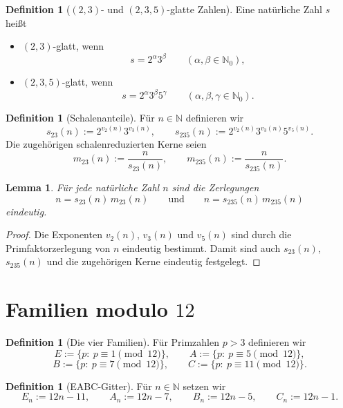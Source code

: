 \documentclass[11pt,a4paper]{article}
\newtheorem{lemma}[satz]{Lemma}
\theoremstyle{definition}
\newtheorem{definition}[satz]{Definition}
\theoremstyle{remark}
\begin{document}
	\begin{definition}[\((2,3)\)- und \((2,3,5)\)-glatte Zahlen]
		Eine natürliche Zahl \(s\) heißt
		\begin{itemize}
			\item \((2,3)\)-glatt, wenn
			\[
			s=2^\alpha 3^\beta
			\qquad (\alpha,\beta\in\mathbb{N}_0),
			\]
			\item \((2,3,5)\)-glatt, wenn
			\[
			s=2^\alpha 3^\beta 5^\gamma
			\qquad (\alpha,\beta,\gamma\in\mathbb{N}_0).
			\]
		\end{itemize}
	\end{definition}
	
	\begin{definition}[Schalenanteile]
		Für \(n\in\mathbb{N}\) definieren wir
		\[
		s_{23}(n):=2^{v_2(n)}3^{v_3(n)},
		\qquad
		s_{235}(n):=2^{v_2(n)}3^{v_3(n)}5^{v_5(n)}.
		\]
		Die zugehörigen schalenreduzierten Kerne seien
		\[
		m_{23}(n):=\frac{n}{s_{23}(n)},
		\qquad
		m_{235}(n):=\frac{n}{s_{235}(n)}.
		\]
	\end{definition}
	
	\begin{lemma}
		Für jede natürliche Zahl \(n\) sind die Zerlegungen
		\[
		n=s_{23}(n)\,m_{23}(n)
		\qquad\text{und}\qquad
		n=s_{235}(n)\,m_{235}(n)
		\]
		eindeutig.
	\end{lemma}
	
	\begin{proof}
		Die Exponenten \(v_2(n)\), \(v_3(n)\) und \(v_5(n)\) sind durch die Primfaktorzerlegung von
		\(n\) eindeutig bestimmt. Damit sind auch \(s_{23}(n)\), \(s_{235}(n)\) und die zugehörigen Kerne
		eindeutig festgelegt.
	\end{proof}
	
	\section{Familien modulo \(12\)}
	
	\begin{definition}[Die vier Familien]
		Für Primzahlen \(p>3\) definieren wir
		\[
		E:=\{p:\ p\equiv 1 \pmod{12}\},\qquad
		A:=\{p:\ p\equiv 5 \pmod{12}\},
		\]
		\[
		B:=\{p:\ p\equiv 7 \pmod{12}\},\qquad
		C:=\{p:\ p\equiv 11 \pmod{12}\}.
		\]
	\end{definition}
	
	\begin{definition}[EABC-Gitter]
		Für \(n\in\mathbb{N}\) setzen wir
		\[
		E_n:=12n-11,\qquad
		A_n:=12n-7,\qquad
		B_n:=12n-5,\qquad
		C_n:=12n-1.
		\]
	\end{definition}
	
\end{document}
